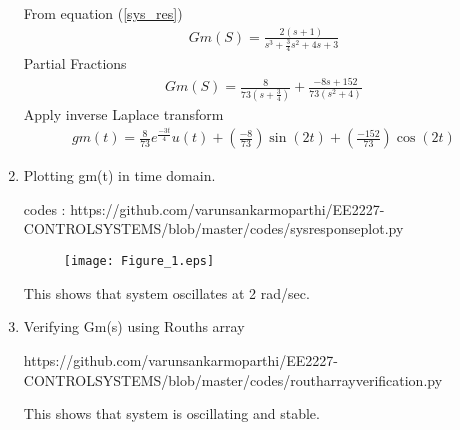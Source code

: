 \begin{enumerate}[label=\thesection.\arabic*.,ref=\thesection.\theenumi]
\solution
From equation (\ref{sys_res})
\begin{align}
 Gm(S) = \frac{2(s+1)}{s^3+\frac{3}{4}s^2+4s+3} 
\end{align}
Partial Fractions
\begin{align}
 Gm(S) = \frac{8}{73(s+\frac{3}{4})}+ \frac{-8s+152}{73(s^2+4)}
\end{align}
Apply inverse Laplace transform
\begin{align}
 gm(t) = \frac{8}{73}e^{\frac{-3t}{4}}u(t)+ (\frac{-8}{73})\sin(2t) +(\frac{-152}{73})\cos(2t)
\end{align}



\item Plotting gm(t) in time domain.

codes : https://github.com/varunsankarmoparthi/EE2227-CONTROLSYSTEMS/blob/master/codes/sysresponseplot.py
\begin{figure}[!h]
  \texttt{[image: Figure\_1.eps]}
 
\end{figure}

This shows that system oscillates at 2 rad/sec.
\item Verifying Gm(s) using Rouths array

https://github.com/varunsankarmoparthi/EE2227-CONTROLSYSTEMS/blob/master/codes/routharrayverification.py


This shows that system is oscillating and stable.
\end{enumerate}

